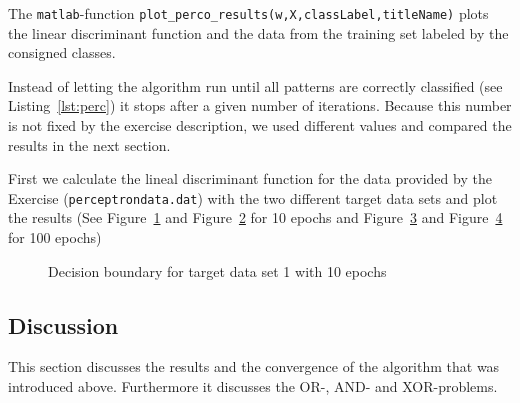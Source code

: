 \documentclass[subfigure,epsfig,fleqn,float,ausarbeitung]{scrartcl}
\begin{document}
The \texttt{matlab}-function \texttt{plot\_perco\_results(w,X,classLabel,titleName)} plots the linear discriminant function and the data from the training set labeled by the consigned classes.

Instead of letting the algorithm run until all patterns are correctly classified (see Listing~\ref{lst:perc}) it stops after a given number of iterations. Because this number is not fixed by the exercise description, we used different values and compared the results in the next section.

First we calculate the lineal discriminant function for the data provided by the Exercise (\texttt{perceptrondata.dat}) with the two different target data sets and plot the results (See Figure~\ref{fig:decisionBoundary1} and Figure~\ref{fig:decisionBoundary2} for 10 epochs and Figure~\ref{fig:decisionBoundary1100} and Figure~\ref{fig:decisionBoundary2100} for 100 epochs)

\begin{figure}
	\centering
	\newlength\figureheight 
	\newlength\figurewidth 
	\setlength\figureheight{7cm} 
	\setlength\figurewidth{9cm}
	
	\caption{Decision boundary for target data set 1 with 10 epochs}
	\label{fig:decisionBoundary1}
\end{figure}

\begin{figure}
	\centering
	\setlength\figureheight{7cm} 
	\setlength\figurewidth{9cm}
	
	\caption{}
	\label{fig:decisionBoundary2}
\end{figure}

\begin{figure}
	\centering
	\setlength\figureheight{7cm} 
	\setlength\figurewidth{9cm}
	
	\caption{}
	\label{fig:decisionBoundary1100}
\end{figure}

\begin{figure}
	\centering
	\setlength\figureheight{7cm} 
	\setlength\figurewidth{9cm}
	
	\caption{}
	\label{fig:decisionBoundary2100}
\end{figure}



\subsection{Discussion}

This section discusses the results and the convergence of the algorithm that was introduced above. Furthermore it discusses the OR-, AND- and XOR-problems.
\end{document}
